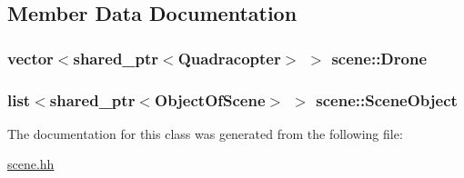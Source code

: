 \subsection{Member Data Documentation}
\subsubsection[{\texorpdfstring{Drone}{Drone}}]{\setlength{\rightskip}{0pt plus 5cm}vector$<$shared\+\_\+ptr$<${\bf Quadracopter}$>$ $>$ scene\+::\+Drone\hspace{0.3cm}{\ttfamily [private]}}\hypertarget{classscene_a3798bb3e6e4813c381a6934bb264ddcc}{}\label{classscene_a3798bb3e6e4813c381a6934bb264ddcc}
\subsubsection[{\texorpdfstring{Scene\+Object}{SceneObject}}]{\setlength{\rightskip}{0pt plus 5cm}list$<$shared\+\_\+ptr$<${\bf Object\+Of\+Scene}$>$ $>$ scene\+::\+Scene\+Object\hspace{0.3cm}{\ttfamily [private]}}\hypertarget{classscene_a5adf71e0375b90603aa75148c2927ecb}{}\label{classscene_a5adf71e0375b90603aa75148c2927ecb}


The documentation for this class was generated from the following file\+:\begin{DoxyCompactItemize}
\item 
\hyperlink{scene_8hh}{scene.\+hh}\end{DoxyCompactItemize}
